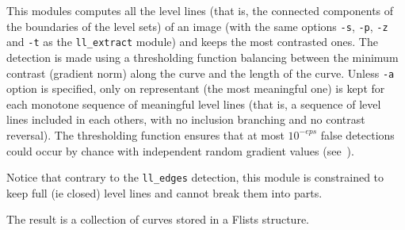 This modules computes all the level lines (that is, the connected
components of the boundaries of the level sets) of an image 
(with the same options \verb+-s+, \verb+-p+, \verb+-z+ and \verb+-t+ 
as the \verb+ll_extract+ module) and keeps the most contrasted ones.
The detection is made using a thresholding function balancing between 
the minimum contrast (gradient norm) along the curve and the
length of the curve. Unless \verb+-a+ option is specified, only
on representant (the most meaningful one) is kept for each 
monotone sequence of meaningful level lines (that is, a sequence
of level lines included in each others, with no inclusion
branching and no contrast reversal).
The thresholding function ensures
that at most $10^{-eps}$ false detections could occur by chance
with independent random gradient values (see~\cite{desolneux.moisan.ea:edge}).

\medskip

Notice that contrary to the \verb+ll_edges+ detection, this 
module is constrained to keep full (ie closed) level lines and 
cannot break them into parts.

\medskip

The result is a collection of curves stored in a Flists structure.
